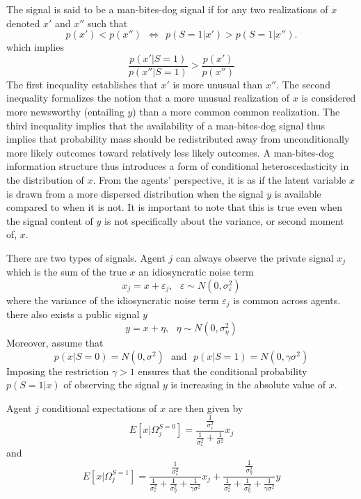 \documentclass{article}
\begin{document}
{The signal is said to be a man-bites-dog signal if for any two realizations of $x$ denoted $x'$ and $x''$ such that
$$
p(x') < p(x'') \ \ \iff \ \ p(S = 1| x') > p(S = 1 | x'').
$$
which implies
$$
\frac{p(x'|S=1)}{p(x''|S=1)} > \frac{p(x')}{p(x'')} 
$$
The first inequality establishes that $x'$ is more unusual than $x''$. The second inequality formalizes the notion that a more unusual realization of $x$ is considered more newsworthy (entailing $y$) than a more common common realization. The third inequality implies that the availability of a man-bites-dog signal thus implies that probability mass should be redistributed away from unconditionally more likely outcomes toward relatively less likely outcomes. A man-bites-dog information structure thus introduces a form of conditional heteroscedasticity in the distribution of $x$. From the agents' perspective, it is as if the latent variable $x$ is drawn from a more dispersed distribution when the signal $y$ is available compared to when it is not. It is important to note that this is true even when the signal content of $y$ is not specifically about the variance, or second moment of, $x$.

There are two types of signals. Agent $j$ can always observe the private signal $x_j$ which is the sum of the true $x$ an idiosyncratic noise term
	$$
x_j = x + \varepsilon_j, \ \ \ \varepsilon \sim N(0, \sigma^2_{\varepsilon})
$$
where the variance of the idiosyncratic noise term $\varepsilon_j$ is common across agents. there also exists a public signal $y$
$$
y = x + \eta, \ \ \ \eta \sim N(0, \sigma^2_{\eta})
$$
Moreover, assume that
	$$
	p(x|S=0) = N(0,\sigma^2) \ \ \ \text{and} \ \ \ p(x|S=1) = N(0, \gamma \sigma^2)
	$$
Imposing the restriction $\gamma > 1$ ensures that the conditional probability $p(S=1|x)$ of observing the signal $y$ is increasing in the absolute value of $x$.

Agent $j$ conditional expectations of $x$ are then given by
$$
E[x|\Omega^{S=0}_j] = \frac{\frac{1}{\sigma^2_{\varepsilon}}}{\frac{1}{\sigma^2_{\varepsilon}} + \frac{1}{\sigma^2}}x_j
$$ 
and
$$
E[x|\Omega^{S=1}_j] = \frac{\frac{1}{\sigma^2_{\varepsilon}}}{\frac{1}{\sigma^2_{\varepsilon}} + \frac{1}{\sigma_{\eta}^2} + \frac{1}{\gamma \sigma^2}}x_j + \frac{\frac{1}{\sigma^2_{\eta}}}{\frac{1}{\sigma^2_{\varepsilon}} + \frac{1}{\sigma_{\eta}^2} + \frac{1}{\gamma \sigma^2}}y
$$

}
\end{document}
